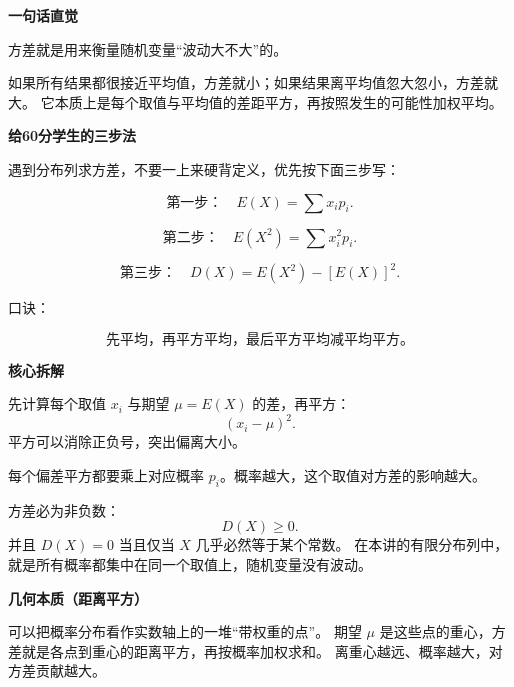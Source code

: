 \begin{explanationbox}
	\textbf{\textcolor{CExplanation}{一句话直觉}}

	方差就是用来衡量随机变量“波动大不大”的。

	如果所有结果都很接近平均值，方差就小；如果结果离平均值忽大忽小，方差就大。
	它本质上是每个取值与平均值的差距平方，再按照发生的可能性加权平均。

	\medskip

	\textbf{\textcolor{CExplanation}{给60分学生的三步法}}

	遇到分布列求方差，不要一上来硬背定义，优先按下面三步写：

	\[
		\text{第一步：} \quad E(X)=\sum x_ip_i.
	\]

	\[
		\text{第二步：} \quad E(X^2)=\sum x_i^2p_i.
	\]

	\[
		\text{第三步：} \quad D(X)=E(X^2)-[E(X)]^2.
	\]

	口诀：

	\[
		\boxed{\text{先平均，再平方平均，最后平方平均减平均平方。}}
	\]

	\medskip

	\textbf{\textcolor{CExplanation}{核心拆解}}

	\begin{description}[style=nextline, leftmargin=2.8em, labelsep=0.5em, itemsep=0.45em]
		\item[\textbf{要点一（偏差平方）：}]
		      先计算每个取值 $x_i$ 与期望 $\mu=E(X)$ 的差，再平方：
		      \[
			      (x_i-\mu)^2.
		      \]
		      平方可以消除正负号，突出偏离大小。

		\item[\textbf{要点二（概率加权）：}]
		      每个偏差平方都要乘上对应概率 $p_i$。概率越大，这个取值对方差的影响越大。

		\item[\textbf{要点三（非负性）：}]
		      方差必为非负数：
		      \[
			      D(X)\ge 0.
		      \]
		      并且 $D(X)=0$ 当且仅当 $X$ 几乎必然等于某个常数。
		      在本讲的有限分布列中，就是所有概率都集中在同一个取值上，随机变量没有波动。
	\end{description}

	\medskip

	\textbf{\textcolor{CExplanation}{几何本质（距离平方）}}

	可以把概率分布看作实数轴上的一堆“带权重的点”。
	期望 $\mu$ 是这些点的重心，方差就是各点到重心的距离平方，再按概率加权求和。
	离重心越远、概率越大，对方差贡献越大。

	\medskip


\end{explanationbox}
